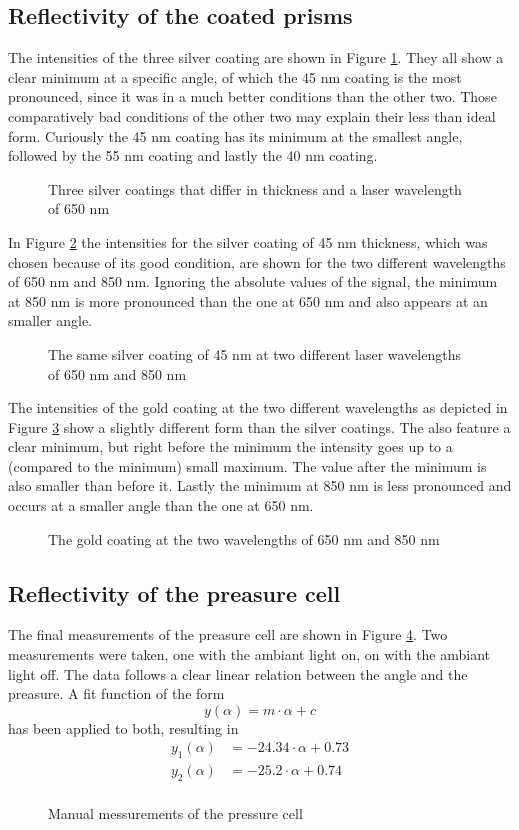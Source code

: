 \documentclass[twoside,english,headsepline=on,DIV=12]{scrartcl}
\numberwithin{equation}{section}
\begin{document}
\subsection{Reflectivity of the coated prisms}
The intensities of the three silver coating are shown in Figure \ref{fig:Ag}. They all show a clear minimum at a specific angle, of which the 45 nm coating is the most pronounced, since it was in a much better conditions than the other two. Those comparatively bad conditions of the other two may explain their less than ideal form. Curiously the 45 nm coating has its minimum at the smallest angle, followed by the 55 nm coating and lastly the 40 nm coating. 
\begin{figure}
	
	\caption{Three silver coatings that differ in thickness and a laser wavelength of 650 nm}
	\label{fig:Ag}
\end{figure}
In Figure \ref{fig:Ag2} the intensities for the silver coating of 45 nm thickness, which was chosen because of its good condition, are shown for the two different wavelengths of 650 nm and 850 nm. Ignoring the absolute values of the signal, the minimum at 850 nm is more pronounced than the one at 650 nm and also appears at an smaller angle. 
\begin{figure}
	
	\caption{The same silver coating of 45 nm at two different laser wavelengths of 650 nm and 850 nm}
	\label{fig:Ag2}
\end{figure}
The intensities of the gold coating at the two different wavelengths as depicted in Figure \ref{fig:Au} show a slightly different form than the silver coatings. The also feature a clear minimum, but right before the minimum the intensity goes up to a (compared to the minimum) small maximum. The value after the minimum is also smaller than before it. Lastly the minimum at 850 nm is less pronounced and occurs at a smaller angle than the one at 650 nm.
\begin{figure}
	
	\caption{The gold coating at the two wavelengths of 650 nm and 850 nm}
	\label{fig:Au}
\end{figure}
\subsection{Reflectivity of the preasure cell}
The final measurements of the preasure cell are shown in Figure \ref{fig:preasure}. Two measurements were taken, one with the ambiant light on, on with the ambiant light off. The data follows a clear linear relation between the angle and the preasure. A fit function of the form
\[
y(\alpha) = m\cdot\alpha + c
\]
has been applied to both, resulting in 
\begin{align*}
y_1(\alpha) &= -24.34\cdot\alpha + 0.73 \\
y_2(\alpha) &= -25.2 \cdot\alpha + 0.74 \\
\end{align*}
\begin{figure}
	
	\caption{Manual messurements of the pressure cell}
	\label{fig:preasure}
\end{figure}
\printbibliography
\end{document}
